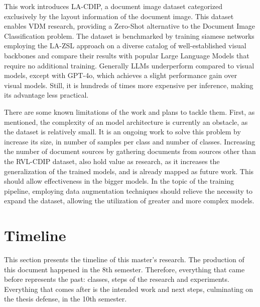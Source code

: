 This work introduces \gls{LA-CDIP}, a document image dataset categorized exclusively by the layout information of the document image. This dataset enables \gls{VDM} research, providing a Zero-Shot alternative to the Document Image Classification problem. The dataset is benchmarked by training siamese networks employing the \gls{LA-ZSL} approach on a diverse catalog of well-established visual backbones and compare their results with popular Large Language Models that require no additional training. Generally \glspl{LLM} underperform compared to visual models, except with GPT-4o, which achieves a slight performance gain over visual models. Still, it is hundreds of times more expensive per inference, making its advantage less practical.

There are some known limitations of the work and plans to tackle them. First, as mentioned, the complexity of an model architecture is currently an obstacle, as the dataset is relatively small. It is an ongoing work to solve this problem by increase its size, in number of samples per class and number of classes. Increasing the number of document sources by gathering documents from sources other than the RVL-CDIP dataset, also hold value as research, as it increases the generalization of the trained models, and is already mapped as future work. This should allow effectiveness in the bigger models. In the topic of the training pipeline, employing data augmentation techniques should relieve the necessity to expand the dataset, allowing the utilization of greater and more complex models.

\section{Timeline}

This section presents the timeline of this master's research. The production of this document happened in the 8th semester. Therefore, everything that came before represents the past: classes, steps of the research and experiments. Everything that comes after is the intended work and next steps, culminating on the thesis defense, in the 10th semester.

